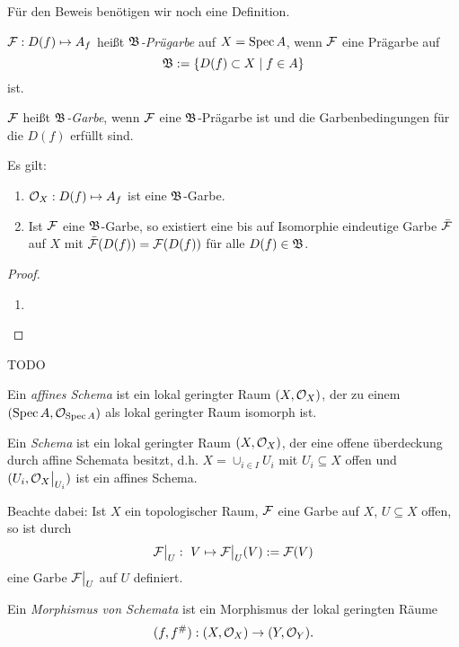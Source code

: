 Für den Beweis benötigen wir noch eine Definition.

\begin{definition}
	$\mathcal{F}:D(f) \mapsto A_f$ heißt \emph{$\mathfrak B$-Prügarbe} auf
	$X = \operatorname{Spec} A$, wenn 
	$\mathcal{F}$ eine Prägarbe auf 
	\[
		\mathfrak B := \{D(f) \subset X \mid f \in A\}
	\]
	ist.
	
	$\mathcal{F}$ heißt \emph{$\mathfrak B$-Garbe}, wenn $\mathcal{F}$ eine $\mathfrak B$-Prägarbe ist
	und die Garbenbedingungen für die $D(f)$ erfüllt sind.
\end{definition}

\begin{hilfslemma}
	\label{hilfslemma:1}
	Es gilt:
	\begin{enumerate}
	  \item $\mathcal{O}_X: D(f) \mapsto A_f$ ist eine $\mathfrak B$-Garbe.
	  \item Ist $\mathcal{F}$ eine $\mathfrak B$-Garbe, so existiert eine bis auf
	  	Isomorphie eindeutige Garbe $\bar {\mathcal{F}}$ auf $X$ mit
	  	$\bar{\mathcal{F}}(D(f)) = \mathcal{F}(D(f))$ für alle $D(f) \in \mathfrak B$.
	\end{enumerate}
\end{hilfslemma}
\begin{proof}
	\begin{enumerate}
	  \item 
	\end{enumerate}
\end{proof}


 TODO
 
 
\begin{definition}
	Ein \emph{affines Schema} ist ein lokal geringter Raum
	$(X,\mathcal{O}_X)$, der zu einem $(\operatorname{Spec} A, \mathcal{O}_{\operatorname{Spec} A})$ als lokal geringter
	Raum isomorph ist.
	
	Ein \emph{Schema} ist ein lokal geringter Raum $(X,\mathcal{O}_X)$, der eine
	offene überdeckung durch affine Schemata besitzt, d.h.
	$X = \cup_{i\in I} U_i$ mit $U_i \subseteq X$ offen und 
	$(U_i, \mathcal{O}_X\big|_{U_i})$ ist ein affines Schema.
\end{definition}

\begin{bemerkung}
	Beachte dabei: Ist $X$ ein topologischer Raum, $\mathcal{F}$ eine Garbe auf $X$,
	$U\subseteq X$ offen, so ist durch
	\[
		\mathcal{F}\big|_{U}:\ V \mapsto \mathcal{F}\big|_{U} (V) := \mathcal{F}(V)
	\]
	eine Garbe $\mathcal{F}\big|_{U}$ auf $U$ definiert.
\end{bemerkung}

\begin{definition}
	Ein \emph{Morphismus von Schemata} ist ein
	Morphismus der lokal geringten Räume
	\[
		(f,f^{\#}): (X, \mathcal{O}_X)  \to  (Y, \mathcal{O}_Y).
	\]
\end{definition}

